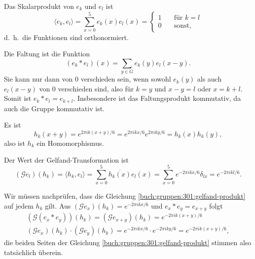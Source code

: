 \begin{loesung}
\begin{teilaufgaben}
\item
Das Skalarprodukt von $e_k$ und $e_l$ ist
\[
\langle e_k,e_l\rangle
=
\sum_{x=0}^5 e_k(x)e_l(x)
=
\begin{cases}
1&\quad\text{für $k=l$}\\
0&\quad\text{sonst,}
\end{cases}
\]
d.~h.~die Funktionen sind orthonormiert.
\item
Die Faltung ist die Funktion
\[
(e_k*e_l)(x)
=
\sum_{y\in G} e_k(y)e_l(x-y).
\]
Sie kann nur dann von $0$ verschieden sein, wenn sowohl 
$e_k(y)$ als auch $e_l(x-y)$ von $0$ verschieden sind, also
für $k=y$ und $x-y=l$ oder $x=k+l$.
Somit ist $e_k*e_l=e_{k+l}$.
Insbesondere ist das Faltungsprodukt kommutativ, da auch die
Gruppe kommutativ ist.
\item
Es ist
\[
h_k(x+y)=e^{2\pi ik(x+y)/6} = e^{2\pi ikx/6}e^{2\pi iky/6} = h_k(x)h_k(y),
\]
also ist $h_k$ ein Homomorphismus.
\item
Der Wert der Gelfand-Transformation ist
\[
(\mathscr{G}e_l)(h_k)
=
\langle h_k,e_l\rangle
=
\sum_{x=0}^5 \overline{h_k(x)} e_l(x)
=
\sum_{x=0}^5 e^{-2\pi ikx/6}\delta_{lx}
=
e^{-2\pi ikl/6}.
\]
\item
Wir müssen nachprüfen, dass die Gleichung
\eqref{buch:gruppen:301:gelfand-produkt}
auf jedem $h_k$ gilt.
Aus $(\mathscr{G}e_x)(h_k)=e^{-2\pi ikx/6}$ und
$e_x*e_y=e_{x+y}$
folgt
\begin{align*}
(\mathscr{G}(e_x*e_y))(h_k)
=
(\mathscr{G}e_{x+y})(h_k)
=e^{-2\pi ik(x+y)/6}
\\
(\mathscr{G}e_x)(h_k)
\cdot
(\mathscr{G}e_y)(h_k)
=
e^{-2\pi ikx/6}\cdot e^{-2\pi iky/6}
=
e^{-2\pi ik(x+y)/6},
\end{align*}
die beiden Seiten der Gleichung
\eqref{buch:gruppen:301:gelfand-produkt}
stimmen also tatsächlich überein.
\end{teilaufgaben}
\end{loesung}
